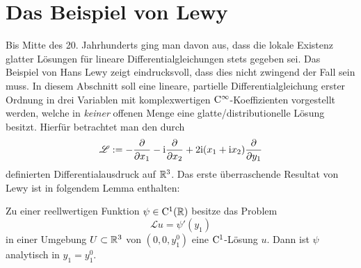 

\section{Das Beispiel von Lewy}


Bis Mitte des 20. Jahrhunderts ging man davon aus, dass die lokale Existenz glatter Lösungen für lineare Differentialgleichungen stets gegeben sei. Das Beispiel von Hans Lewy zeigt eindrucksvoll, dass dies nicht zwingend der Fall sein muss.  In diesem Abschnitt soll eine lineare, partielle Differentialgleichung erster Ordnung in drei Variablen mit komplexwertigen $\mathrm C^\infty$-Koeffizienten vorgestellt werden, welche in \textit{keiner} offenen Menge eine glatte/distributionelle Lösung besitzt. Hierfür betrachtet man den durch
\begin{equation}\label{lewy:differentialausdruck}
\mathscr L := -\frac{\partial}{\partial x_1} -\mathrm i\frac{\partial}{\partial x_2} +2\mathrm i(x_1+\mathrm i x_2)\frac{\partial}{\partial y_1}
\end{equation}
definierten Differentialausdruck auf $\mathbb R^3$. Das erste überraschende Resultat von Lewy ist in folgendem Lemma enthalten:
\begin{lem}\label{thm:1_lewy}
Zu einer reellwertigen Funktion $\psi\in \mathrm C^1(\mathbb{R})$ besitze das Problem
\begin{equation}\label{eq:1_lewy:gleichung}
\mathscr Lu=\psi'(y_1)
\end{equation}
in einer Umgebung $U\subset\mathbb R^3$ von $(0,0,y_1^0)$ eine $\mathrm C^1$-Lösung $u$. Dann ist $\psi$ analytisch in $y_1=y_1^0$.
\end{lem}

